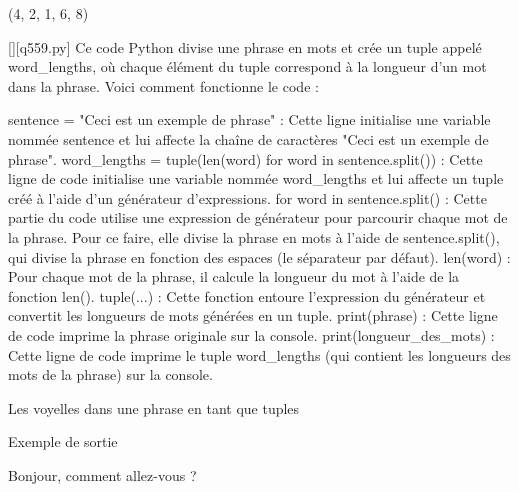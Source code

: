 (4, 2, 1, 6, 8)
        \par
        \begin{solution}
            \renewcommand{\nomfichier}{q559.py}
            \pythonfile{\chemincode \nomfichier}[][\nomfichier]
            Ce code Python divise une phrase en mots et crée un tuple appelé word\_lengths, où chaque élément du tuple correspond à la longueur d'un mot dans la phrase. Voici comment fonctionne le code :

    sentence = "Ceci est un exemple de phrase" : Cette ligne initialise une variable nommée sentence et lui affecte la chaîne de caractères "Ceci est un exemple de phrase".
    word\_lengths = tuple(len(word) for word in sentence.split()) : Cette ligne de code initialise une variable nommée word\_lengths et lui affecte un tuple créé à l'aide d'un générateur d'expressions.
        for word in sentence.split() : Cette partie du code utilise une expression de générateur pour parcourir chaque mot de la phrase. Pour ce faire, elle divise la phrase en mots à l'aide de sentence.split(), qui divise la phrase en fonction des espaces (le séparateur par défaut).
        len(word) : Pour chaque mot de la phrase, il calcule la longueur du mot à l'aide de la fonction len().
        tuple(...) : Cette fonction entoure l'expression du générateur et convertit les longueurs de mots générées en un tuple.
    print(phrase) : Cette ligne de code imprime la phrase originale sur la console.
    print(longueur\_des\_mots) : Cette ligne de code imprime le tuple word\_lengths (qui contient les longueurs des mots de la phrase) sur la console.
        \end{solution}
        

        \question
        Les voyelles dans une phrase en tant que tuples

Exemple de sortie

Bonjour, comment allez-vous ?

